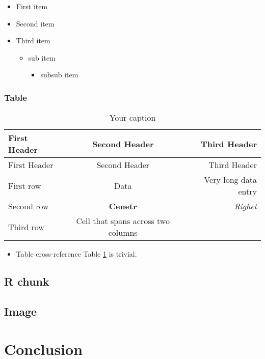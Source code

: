 \documentclass[
  11pt,
]{article}
\providecommand{\tightlist}{%
   \setlength{\itemsep}{0pt}\setlength{\parskip}{0pt}
}
\begin{document}
\begin{itemize}
\tightlist
\item
  First item
\item
  Second item
\item
  Third item

  \begin{itemize}
  \tightlist
  \item
    sub item

    \begin{itemize}
    \tightlist
    \item
      subsub item
    \end{itemize}
  \end{itemize}
\end{itemize}

\hypertarget{tab}{%
\subsubsection{Table}\label{tab}}

\begin{longtable}[]{@{}lcr@{}}
\caption{\label{tab:tab1} Your caption}\tabularnewline
\toprule
First Header & Second Header & Third Header \\
\midrule
\endfirsthead
\toprule
First Header & Second Header & Third Header \\
\midrule
\endhead
First row & Data & Very long data entry \\
Second row & \textbf{Cenetr} & \emph{Righet} \\
Third row & Cell that spans across two columns & \\
\bottomrule
\end{longtable}

\begin{itemize}
\tightlist
\item
  Table cross-reference
  Table \ref{tab:tab1} is trivial.
\end{itemize}

\hypertarget{chunk}{%
\subsection{R chunk}\label{chunk}}

\hypertarget{img}{%
\subsection{Image}\label{img}}

\hypertarget{conc}{%
\section{Conclusion}\label{conc}}

\lipsum[3]
\end{document}
